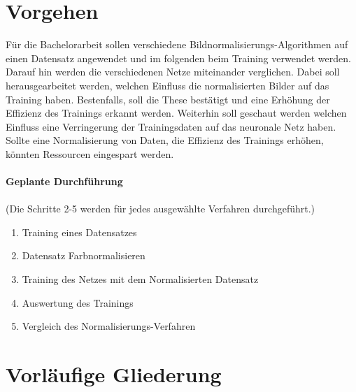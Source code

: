 \documentclass[a4paper,12pt,oneside]{article}
\begin{document}
  \section{Vorgehen}
  Für die Bachelorarbeit sollen verschiedene Bildnormalisierungs-Algorithmen auf einen 
  Datensatz angewendet und im folgenden beim Training verwendet werden. Darauf hin 
  werden die verschiedenen Netze miteinander verglichen. Dabei soll herausgearbeitet werden, 
  welchen Einfluss die normalisierten Bilder auf das Training haben. Bestenfalls, soll die These 
  bestätigt und eine Erhöhung der Effizienz des Trainings erkannt werden. 
  Weiterhin soll geschaut werden welchen Einfluss eine Verringerung der Trainingsdaten auf das 
  neuronale Netz haben. Sollte eine Normalisierung von Daten, die Effizienz des 
  Trainings erhöhen, könnten Ressourcen eingespart werden.\\\\
  \textbf{Geplante Durchführung}\\\\
  (Die Schritte 2-5 werden für jedes ausgewählte Verfahren durchgeführt.)
  \begin{enumerate}
  \item Training eines Datensatzes
  \item Datensatz Farbnormalisieren
  \item Training des Netzes mit dem Normalisierten Datensatz
  \item Auswertung des Trainings
  \item Vergleich des Normalisierungs-Verfahren
  \end{enumerate}
  
  \newpage
  
  \section{Vorläufige Gliederung}
  
\end{document}
